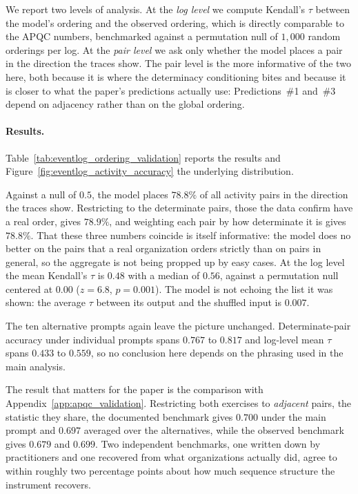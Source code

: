 We report two levels of analysis.
At the \emph{log level} we compute Kendall's $\tau$ between the model's ordering and the observed ordering, which is directly comparable to the APQC numbers, benchmarked against a permutation null of $1{,}000$ random orderings per log.
At the \emph{pair level} we ask only whether the model places a pair in the direction the traces show.
The pair level is the more informative of the two here, both because it is where the determinacy conditioning bites and because it is closer to what the paper's predictions actually use: Predictions~\#1 and~\#3 depend on adjacency rather than on the global ordering.

\paragraph{Results.}
\label{app:eventlog_results}
Table~\ref{tab:eventlog_ordering_validation} reports the results and Figure~\ref{fig:eventlog_activity_accuracy} the underlying distribution.

Against a null of $0.5$, the model places $78.8\%$ of all activity pairs in the direction the traces show.
Restricting to the determinate pairs, those the data confirm have a real order, gives $78.9\%$, and weighting each pair by how determinate it is gives $78.8\%$.
That these three numbers coincide is itself informative: the model does no better on the pairs that a real organization orders strictly than on pairs in general, so the aggregate is not being propped up by easy cases.
At the log level the mean Kendall's $\tau$ is $0.48$ with a median of $0.56$, against a permutation null centered at $0.00$ ($z = 6.8$, $p = 0.001$).
The model is not echoing the list it was shown: the average $\tau$ between its output and the shuffled input is $0.007$.

The ten alternative prompts again leave the picture unchanged.
Determinate-pair accuracy under individual prompts spans $0.767$ to $0.817$ and log-level mean $\tau$ spans $0.433$ to $0.559$, so no conclusion here depends on the phrasing used in the main analysis.

The result that matters for the paper is the comparison with Appendix~\ref{app:apqc_validation}.
Restricting both exercises to \emph{adjacent} pairs, the statistic they share, the documented benchmark gives $0.700$ under the main prompt and $0.697$ averaged over the alternatives, while the observed benchmark gives $0.679$ and $0.699$.
Two independent benchmarks, one written down by practitioners and one recovered from what organizations actually did, agree to within roughly two percentage points about how much sequence structure the instrument recovers.

